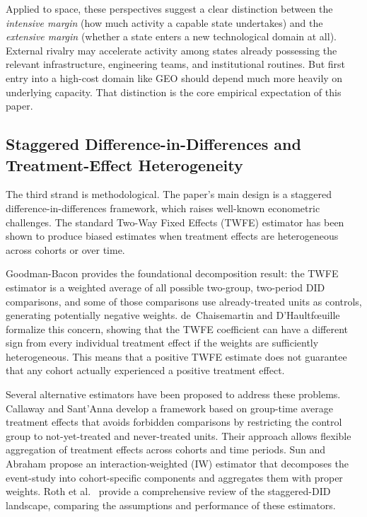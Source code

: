 \documentclass[11pt]{article}
\begin{document}
Applied to space, these perspectives suggest a clear distinction between the \emph{intensive margin} (how much activity a capable state undertakes) and the \emph{extensive margin} (whether a state enters a new technological domain at all). External rivalry may accelerate activity among states already possessing the relevant infrastructure, engineering teams, and institutional routines. But first entry into a high-cost domain like GEO should depend much more heavily on underlying capacity. That distinction is the core empirical expectation of this paper.

\subsection{Staggered Difference-in-Differences and Treatment-Effect Heterogeneity}

The third strand is methodological. The paper's main design is a staggered difference-in-differences framework, which raises well-known econometric challenges. The standard Two-Way Fixed Effects (TWFE) estimator has been shown to produce biased estimates when treatment effects are heterogeneous across cohorts or over time.

Goodman-Bacon \cite{goodmanbacon2021} provides the foundational decomposition result: the TWFE estimator is a weighted average of all possible two-group, two-period DID comparisons, and some of those comparisons use already-treated units as controls, generating potentially negative weights. de~Chaisemartin and D'Haultf\oe uille \cite{dechaisemartin2020} formalize this concern, showing that the TWFE coefficient can have a different sign from every individual treatment effect if the weights are sufficiently heterogeneous. This means that a positive TWFE estimate does not guarantee that any cohort actually experienced a positive treatment effect.

Several alternative estimators have been proposed to address these problems. Callaway and Sant'Anna \cite{callaway2021} develop a framework based on group-time average treatment effects that avoids forbidden comparisons by restricting the control group to not-yet-treated and never-treated units. Their approach allows flexible aggregation of treatment effects across cohorts and time periods. Sun and Abraham \cite{sunab2021} propose an interaction-weighted (IW) estimator that decomposes the event-study into cohort-specific components and aggregates them with proper weights. Roth et al.\ \cite{roth2023} provide a comprehensive review of the staggered-DID landscape, comparing the assumptions and performance of these estimators.
\end{document}
